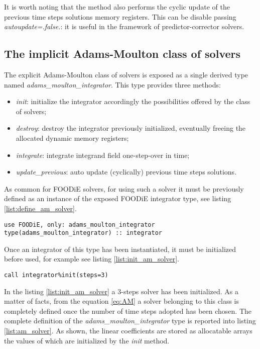 \documentclass[pdftex,preprint,3p,times,numbers]{elsarticle}
\begin{document}
It is worth noting that the method also performs the cyclic update of the previous time steps solutions memory registers. This can be disable passing \emph{autoupdate=.false.}: it is useful in the framework of predictor-corrector solvers.

\subsection{The implicit Adams-Moulton class of solvers}\label{subsec:solver_am}

The explicit Adams-Moulton class of solvers is exposed as a single derived type named \emph{adams\_moulton\_integrator}. This type provides three methods:

\begin{itemize}
  \item \emph{init}: initialize the integrator accordingly the possibilities offered by the class of solvers;
  \item \emph{destroy}: destroy the integrator previously initialized, eventually freeing the allocated dynamic memory registers;
  \item \emph{integrate}: integrate integrand field one-step-over in time;
  \item \emph{update\_previous}: auto update (cyclically) previous time steps solutions.
  \end{itemize}

As common for FOODiE solvers, for using such a solver it must be previously defined as an instance of the exposed FOODiE integrator type, see listing \ref{list:define_am_solver}.

\begin{lstlisting}[firstnumber=1,style=code,caption={definition of an implicit Adams-Moulton integrator},label={list:define_am_solver}]
use FOODiE, only: adams_moulton_integrator
type(adams_moulton_integrator) :: integrator
\end{lstlisting}

Once an integrator of this type has been instantiated, it must be initialized before used, for example see listing \ref{list:init_am_solver}.

\begin{lstlisting}[firstnumber=1,style=code,caption={example of initialization of an implicit Adams-Moulton integrator},label={list:init_am_solver}]
call integrator%init(steps=3)
\end{lstlisting}

In the listing \ref{list:init_am_solver} a 3-steps solver has been initialized. As a matter of facts, from the equation \ref{eq:AM} a solver belonging to this class is completely defined once the number of time steps adopted has been chosen. The complete definition of the \emph{adams\_moulton\_integrator} type is reported into listing \ref{list:am_solver}. As shown, the linear coefficients are stored as allocatable arrays the values of which are initialized by the \emph{init} method.
\end{document}
